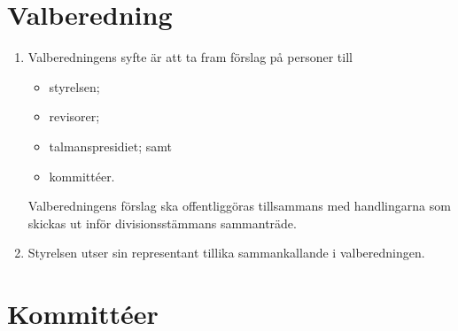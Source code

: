 \documentclass{dvd}
\begin{document}
	\section{Valberedning}

	\begin{enumerate}[label=\arabic* §, ref=\arabic*]
		\item Valberedningens syfte är att ta fram förslag på personer till
		\begin{itemize}
			\item styrelsen;
			\item revisorer;
			\item talmanspresidiet; samt
			\item kommittéer.
		\end{itemize}

		Valberedningens förslag ska offentliggöras tillsammans med handlingarna som skickas ut inför divisionsstämmans sammanträde.

		\item Styrelsen utser sin representant tillika sammankallande i valberedningen.
	\end{enumerate}

	\section{Kommittéer}
\end{document}

